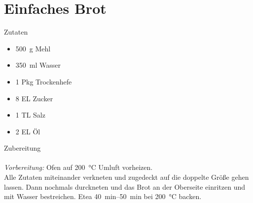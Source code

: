 \section*{Einfaches Brot}
\ihead{}\ohead{}
\cfoot{}
{\Large Zutaten}
\begin{multicols}{2}
\begin{itemize}
    \item \SI{500}{g} Mehl
    \item \SI{350}{ml} Wasser
    \item \num{1} Pkg Trockenhefe
    \item \num{8} EL Zucker
    \item \num{1} TL Salz
    \item \num{2} EL Öl
\end{itemize}
\end{multicols}
\noindent
{\Large Zubereitung}\\
\\
\textit{Vorbereitung:} Ofen auf \SI{200}{\celsius} Umluft vorheizen.\\
Alle Zutaten miteinander verkneten und zugedeckt auf die doppelte Größe gehen lassen.
Dann nochmals durckneten und das Brot an der Oberseite einritzen und mit Wasser bestreichen.
Etea \SIrange{40}{50}{min} bei \SI{200}{\celsius} backen.
